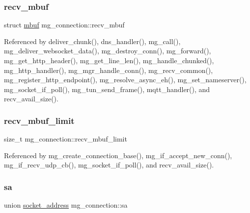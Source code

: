 \subsubsection{\texorpdfstring{recv\+\_\+mbuf}{recv\_mbuf}}
{\footnotesize\ttfamily struct \hyperlink{structmbuf}{mbuf} mg\+\_\+connection\+::recv\+\_\+mbuf}



Referenced by deliver\+\_\+chunk(), dns\+\_\+handler(), mg\+\_\+call(), mg\+\_\+deliver\+\_\+websocket\+\_\+data(), mg\+\_\+destroy\+\_\+conn(), mg\+\_\+forward(), mg\+\_\+get\+\_\+http\+\_\+header(), mg\+\_\+get\+\_\+line\+\_\+len(), mg\+\_\+handle\+\_\+chunked(), mg\+\_\+http\+\_\+handler(), mg\+\_\+mgr\+\_\+handle\+\_\+conn(), mg\+\_\+recv\+\_\+common(), mg\+\_\+register\+\_\+http\+\_\+endpoint(), mg\+\_\+resolve\+\_\+async\+\_\+eh(), mg\+\_\+set\+\_\+nameserver(), mg\+\_\+socket\+\_\+if\+\_\+poll(), mg\+\_\+tun\+\_\+send\+\_\+frame(), mqtt\+\_\+handler(), and recv\+\_\+avail\+\_\+size().

\mbox{\label{structmg__connection_ab15e90e7fb7b8719cc7dcc67f45856e1_ab15e90e7fb7b8719cc7dcc67f45856e1}} 
\subsubsection{\texorpdfstring{recv\+\_\+mbuf\+\_\+limit}{recv\_mbuf\_limit}}
{\footnotesize\ttfamily size\+\_\+t mg\+\_\+connection\+::recv\+\_\+mbuf\+\_\+limit}



Referenced by mg\+\_\+create\+\_\+connection\+\_\+base(), mg\+\_\+if\+\_\+accept\+\_\+new\+\_\+conn(), mg\+\_\+if\+\_\+recv\+\_\+udp\+\_\+cb(), mg\+\_\+socket\+\_\+if\+\_\+poll(), and recv\+\_\+avail\+\_\+size().

\mbox{\label{structmg__connection_a3dfa1816f5a4b0725d9d04be75bbb3f8_a3dfa1816f5a4b0725d9d04be75bbb3f8}} 
\subsubsection{\texorpdfstring{sa}{sa}}
{\footnotesize\ttfamily union \hyperlink{unionsocket__address}{socket\+\_\+address} mg\+\_\+connection\+::sa}



